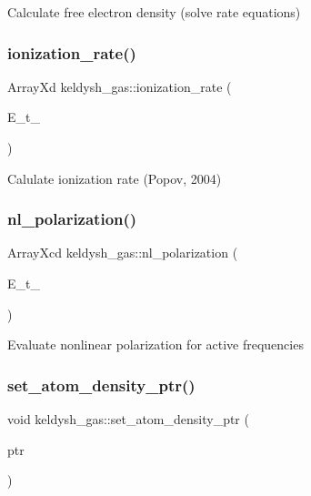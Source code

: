 Calculate free electron density (solve rate equations) \mbox{\label{classkeldysh__gas_a42dc79816adcae9c25499baa7256ec10}} 
\subsubsection{\texorpdfstring{ionization\_rate()}{ionization\_rate()}}
{\footnotesize\ttfamily Array\+Xd keldysh\+\_\+gas\+::ionization\+\_\+rate (\begin{DoxyParamCaption}\item[{Array\+Xd}]{E\+\_\+t\+\_\+ }\end{DoxyParamCaption})}

Calulate ionization rate (Popov, 2004) \mbox{\label{classkeldysh__gas_a1cd65d1983cb6c5ff9d04eeb29e94dd5}} 
\subsubsection{\texorpdfstring{nl\_polarization()}{nl\_polarization()}}
{\footnotesize\ttfamily Array\+Xcd keldysh\+\_\+gas\+::nl\+\_\+polarization (\begin{DoxyParamCaption}\item[{Array\+Xd}]{E\+\_\+t\+\_\+ }\end{DoxyParamCaption})}

Evaluate nonlinear polarization for active frequencies \mbox{\label{classkeldysh__gas_a051c59204ad55298d5632ac2eb4dd626}} 
\subsubsection{\texorpdfstring{set\_atom\_density\_ptr()}{set\_atom\_density\_ptr()}}
{\footnotesize\ttfamily void keldysh\+\_\+gas\+::set\+\_\+atom\+\_\+density\+\_\+ptr (\begin{DoxyParamCaption}\item[{\mbox{\hyperlink{classkeldysh__gas_ab47ad59b466eee349a7500555869b988}{atom\+\_\+density\+\_\+func\+\_\+ptr}}}]{ptr }\end{DoxyParamCaption})\hspace{0.3cm}{\ttfamily [private]}}



